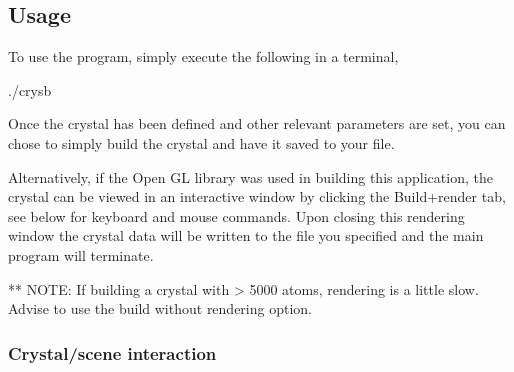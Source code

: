 \subsection*{Usage}

To use the program, simply execute the following in a terminal, \begin{DoxyVerb}    ./crysb  
\end{DoxyVerb}


Once the crystal has been defined and other relevant parameters are set, you can chose to simply build the crystal and have it saved to your file.

Alternatively, if the {\ttfamily Open G\+L} library was used in building this application, the crystal can be viewed in an interactive window by clicking the {\ttfamily Build+render} tab, see below for keyboard and mouse commands. Upon closing this rendering window the crystal data will be written to the file you specified and the main program will terminate.

\begin{DoxyVerb}    ** NOTE: If building a crystal with > 5000 atoms, rendering is a little slow.  Advise
             to use the build without rendering option.
\end{DoxyVerb}


\subsubsection*{Crystal/scene interaction}

